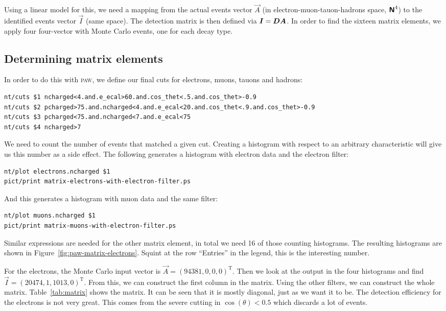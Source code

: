 \documentclass[11pt, english, fleqn, DIV=15, headinclude, BCOR=2cm]{scrreprt}
\begin{document}
Using a linear model for this, we need a mapping from the actual events vector
$\vec A$ (in electron-muon-tauon-hadrons space, $\text{\bfseries\sffamily{N}}^4$) to the identified events
vector $\vec I$ (same space). The detection matrix is then defined via $\vec I
= \mat D \vec A$. In order to find the sixteen matrix elements, we apply four
four-vector with Monte Carlo events, one for each decay type.

\subsection{Determining matrix elements}

In order to do this with \textsc{paw}, we define our final cuts for electrons,
muons, tauons and hadrons:

\begin{lstlisting}
nt/cuts $1 ncharged<4.and.e_ecal>60.and.cos_thet<.5.and.cos_thet>-0.9
nt/cuts $2 pcharged>75.and.ncharged<4.and.e_ecal<20.and.cos_thet<.9.and.cos_thet>-0.9
nt/cuts $3 pcharged<75.and.ncharged<7.and.e_ecal<75
nt/cuts $4 ncharged>7
\end{lstlisting}

We need to count the number of events that matched a given cut. Creating a
histogram with respect to an arbitrary characteristic will give us this number
as a side effect. The following generates a histogram with electron data and
the electron filter:

\begin{lstlisting}
nt/plot electrons.ncharged $1
pict/print matrix-electrons-with-electron-filter.ps
\end{lstlisting}

And this generates a histogram with muon data and the same filter:

\begin{lstlisting}
nt/plot muons.ncharged $1
pict/print matrix-muons-with-electron-filter.ps
\end{lstlisting}

Similar expressions are needed for the other matrix element, in total we need
16 of those counting histograms. The resulting histograms are shown in
Figure~\ref{fig:paw-matrix-electrons}. Squint at the row \enquote{Entries} in
the legend, this is the interesting number.

For the electrons, the Monte Carlo input vector is $\vec A = (94381, 0, 0,
0)^\mathrm T$. Then we look at the output in the four histograms and find $\vec
I = (20474, 1, 1013, 0)^\mathrm T$. From this, we can construct the first
column in the matrix. Using the other filters, we can construct the whole
matrix. Table~\ref{tab:matrix} shows the matrix. It can be seen that it is
mostly diagonal, just as we want it to be. The detection efficiency for the
electrons is not very great. This comes from the severe cutting in
$\cos(\theta) < 0.5$ which discards a lot of events.
\end{document}
